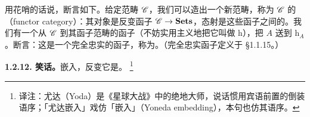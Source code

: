 用花哨的话说，\trYonedaLemma{}断言如下。给定范畴 $\mathscr{C}$，我们可以造出一个新范畴，称为 $\mathscr{C}$ 的\textbf{\trFunctorCategory}（functor category）：其对象是反变函子 $\mathscr{C}\to\mathbf{Sets}$，态射是这些函子之间的\trNaturalTransformation。我们有一个从 $\mathscr{C}$ 到其函子范畴的函子（不妨实用主义地把它叫做 $\mathrm{h}$），把 $A$ 送到 $\mathrm{h}_A$。\trYonedaLemma{}断言：这是一个完全忠实的函子，称为\emph{\trYonedaEmbedding}。（完全忠实函子定义于 \S1.1.15。）

\textbf{1.2.12. 笑话。}\quad \trYoda{}嵌入，反变它是。%
\footnote{译注：尤达（Yoda）是《星球大战》中的绝地大师，说话惯用宾语前置的倒装语序；「尤达嵌入」戏仿「\trYoneda{}嵌入」（Yoneda embedding），本句也仿其语序。}

